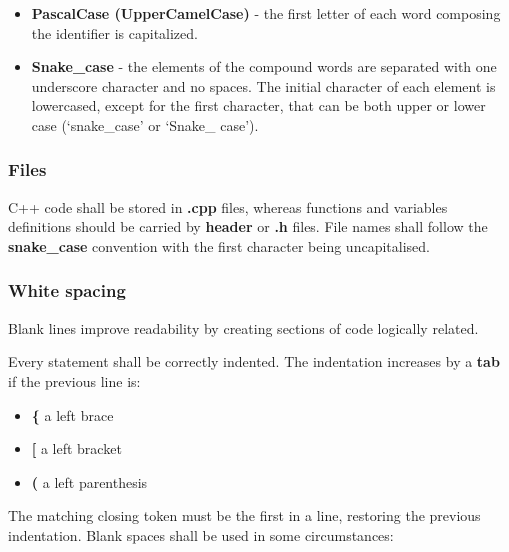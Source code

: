 \documentclass{scrreprt}
\begin{document}
\begin{itemize}
\item \textbf{PascalCase (UpperCamelCase)} - the first letter of each word composing the identifier is capitalized.
\item \textbf{Snake_case} - the elements of the compound words are separated with one underscore character and no spaces. The initial character of each element is lowercased, except for the first character, that can be both upper or lower case (‘snake_case’ or ‘Snake_
case’).
\end{itemize}

\subsubsection{Files}

\par C++ code shall be stored in \textbf{.cpp} files, whereas functions and variables definitions should be carried by \textbf{header} or \textbf{.h} files. File names shall follow the \textbf{snake_case} convention with the first character being uncapitalised.

\subsubsection{White spacing}

\par Blank lines improve readability by creating sections of code logically related. 
\par Every statement shall be correctly indented. The indentation increases by a \textbf{tab} if the previous line is:
\begin{itemize}
\item \textbf{\{} a left brace
\item \textbf{[} a left bracket
\item \textbf{(} a left parenthesis
\end{itemize}
The matching closing token must be the first in a line, restoring the previous indentation.
Blank spaces shall be used in some circumstances:
\end{document}
